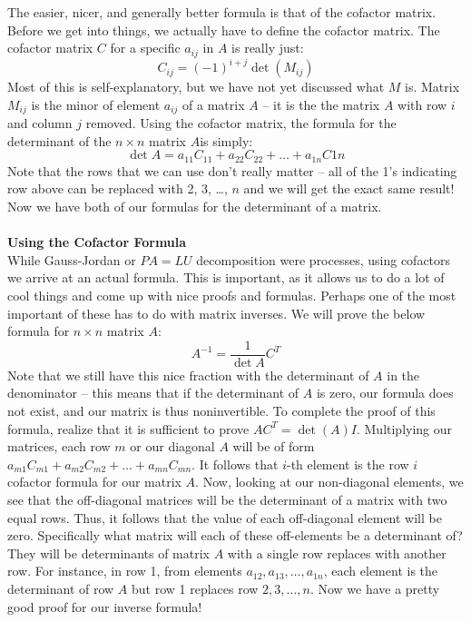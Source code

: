 \documentclass[12pt]{amsart}
\begin{document}
The easier, nicer, and generally better formula is that of the cofactor matrix. Before we get into things, we actually have to define the cofactor matrix. The cofactor matrix $C$ for a specific $a_{ij}$ in $A$ is really just:
\[C_{ij} = (-1)^{i+j} \det (M_{ij})\]
Most of this is self-explanatory, but we have not yet discussed what $M$ is. Matrix $M_{ij}$ is the minor of element $a_{ij}$ of a matrix $A$ -- it is the the matrix $A$ with row $i$ and column $j$ removed. Using the cofactor matrix, the formula for the determinant of the $n \times n$ matrix $A$is simply:
\[\det A = a_{11}C_{11} + a_{22}C_{22} + \dots + a_{1n}C{1n}\]
Note that the rows that we can use don't really matter -- all of the 1's indicating row above can be replaced with 2, 3, \dots, $n$ and we will get the exact same result! Now we have both of our formulas for the determinant of a matrix.\\ \\
\textbf{Using the Cofactor Formula}\\
While Gauss-Jordan or $PA=LU$ decomposition were processes, using cofactors we arrive at an actual formula. This is important, as it allows us to do a lot of cool things and come up with nice proofs and formulas. Perhaps one of the most important of these has to do with matrix inverses. We will prove the below formula for $n \times n$ matrix $A$:
\[A^{-1} = \frac{1}{\det A}C^T\]
Note that we still have this nice fraction with the determinant of $A$ in the denominator -- this means that if the determinant of $A$ is zero, our formula does not exist, and our matrix is thus noninvertible. To complete the proof of this formula, realize that it is sufficient to prove $A C^T = \det(A)I$. Multiplying our matrices, each row $m$ or our diagonal $A$ will be of form $a_{m1}C_{m1} + a_{m2}C_{m2} + \dots + a_{mn}C_{mn}$. It follows that $i$-th element is the row $i$ cofactor formula for our matrix $A$. Now, looking at our non-diagonal elements, we see that the off-diagonal matrices will be the determinant of a matrix with two equal rows. Thus, it follows that the value of each off-diagonal element will be zero. Specifically what matrix will each of these off-elements be a determinant of? They will be determinants of matrix $A$ with a single row replaces with another row. For instance, in row 1, from elements $a_{12}, a_{13}, \dots, a_{1n}$, each element is the determinant of row $A$ but row 1 replaces row $2, 3, \dots , n$. Now we have a pretty good proof for our inverse formula!\\ \\
\end{document}
